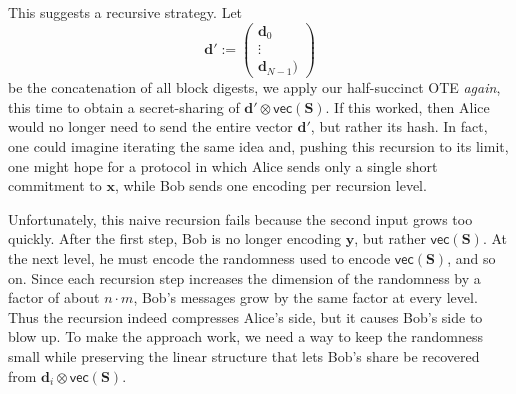 \documentclass{article}
\begin{document}
{This suggests a recursive strategy. Let \[\mathbf{d}' := \begin{pmatrix}\mathbf{d}_0\\\vdots\\\mathbf{d}_{N-1})\end{pmatrix}\]
be the concatenation of all block digests, we apply our half-succinct OTE \emph{again}, this time to obtain a secret-sharing of
$\mathbf{d}' \otimes \mathsf{vec}(\mathbf{S})$.
If this worked, then Alice would no longer need to send the entire vector $\mathbf{d}'$, but rather its hash.
In fact, one could imagine iterating the same idea and, pushing this recursion to its limit, one might hope for a protocol in which Alice sends only a single short commitment to $\mathbf{x}$, while Bob sends one encoding per recursion level.}

{Unfortunately, this naive recursion fails because the second input grows too quickly. After the first step, Bob is no longer encoding $\mathbf{y}$, but rather $\mathsf{vec}(\mathbf{S})$. At the next level, he must encode the randomness used to encode $\mathsf{vec}(\mathbf{S})$, and so on. Since each recursion step increases the dimension of the randomness by a factor of about $n\cdot m$, Bob's messages grow by the same factor at every level. Thus the recursion indeed compresses Alice's side, but it causes Bob's side to blow up. To make the approach work, we need a way to keep the randomness small while preserving the linear structure that lets Bob's share be recovered from $\mathbf{d}_i \otimes \mathsf{vec}(\mathbf{S})$.}
\end{document}
